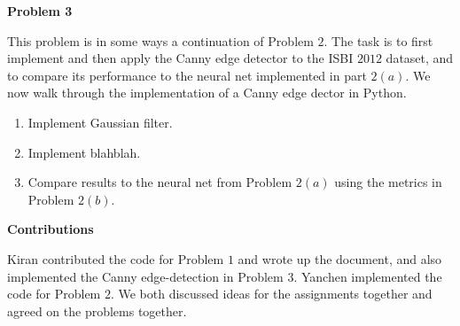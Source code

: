 \documentclass[12pt]{article}
\newcommand{\probnum}[1]
{\large {\bf Problem {#1}}}
\begin{document}
\probnum{3}

This problem is in some ways a continuation of Problem $2$. The task is to first implement and then apply the Canny edge detector to the ISBI $2012$ dataset, and to compare its performance to the neural net implemented in part $2(a)$. We now walk through the implementation of a Canny edge dector in Python.

\begin{enumerate}

\item Implement Gaussian filter. 

\item Implement blahblah. 

\item Compare results to the neural net from Problem $2(a)$ using the metrics in Problem $2(b)$. 

\end{enumerate}

\vspace{0.1in}

\large\textbf{Contributions}

Kiran contributed the code for Problem $1$ and wrote up the document, and also implemented the Canny edge-detection in Problem $3$. 
Yanchen implemented the code for Problem $2$. We both discussed ideas for the assignments together and agreed on the problems together.
\end{document}
